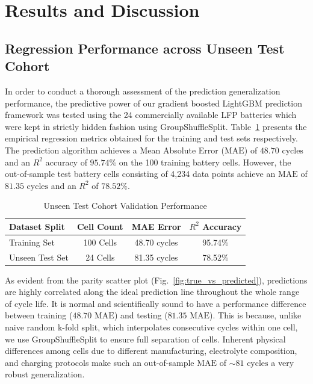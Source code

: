 \documentclass[pdflatex,sn-mathphys-num]{sn-jnl}%
\theoremstyle{thmstyleone}%
\theoremstyle{thmstyletwo}%
\theoremstyle{thmstylethree}%
\begin{document}
\section{Results and Discussion}\label{sec:results_discussion}

\subsection{Regression Performance across Unseen Test Cohort}\label{subsec:regression_perf}

In order to conduct a thorough assessment of the prediction generalization performance, the predictive power of our gradient boosted LightGBM prediction framework was tested using the 24 commercially available LFP batteries which were kept in strictly hidden fashion using GroupShuffleSplit. Table~\ref{tab:test_performance} presents the empirical regression metrics obtained for the training and test sets respectively. The prediction algorithm achieves a Mean Absolute Error ($\text{MAE}$) of $48.70\text{ cycles}$ and an $R^2$ accuracy of $95.74\%$ on the 100 training battery cells. However, the out-of-sample test battery cells consisting of 4,234 data points achieve an $\text{MAE}$ of $81.35\text{ cycles}$ and an $R^2$ of $78.52\%$.

\begin{table}[ht!]
\centering
\caption{Unseen Test Cohort Validation Performance}\label{tab:test_performance}
\small
\begin{tabular}{@{}l c c c@{}}
\toprule
\textbf{Dataset Split} & \textbf{Cell Count} & \textbf{MAE Error} & \textbf{$R^2$ Accuracy} \\
\midrule
Training Set & 100 Cells & 48.70 cycles & 95.74\% \\[1ex]
Unseen Test Set & 24 Cells & 81.35 cycles & 78.52\% \\
\bottomrule
\end{tabular}
\end{table}

As evident from the parity scatter plot (Fig.~\ref{fig:true_vs_predicted}), predictions are highly correlated along the ideal prediction line throughout the whole range of cycle life. It is normal and scientifically sound to have a performance difference between training ($48.70\text{ MAE}$) and testing ($81.35\text{ MAE}$). This is because, unlike naive random k-fold split, which interpolates consecutive cycles within one cell, we use GroupShuffleSplit to ensure full separation of cells. Inherent physical differences among cells due to different manufacturing, electrolyte composition, and charging protocols make such an out-of-sample $\text{MAE}$ of $\sim 81\text{ cycles}$ a very robust generalization.
\end{document}

